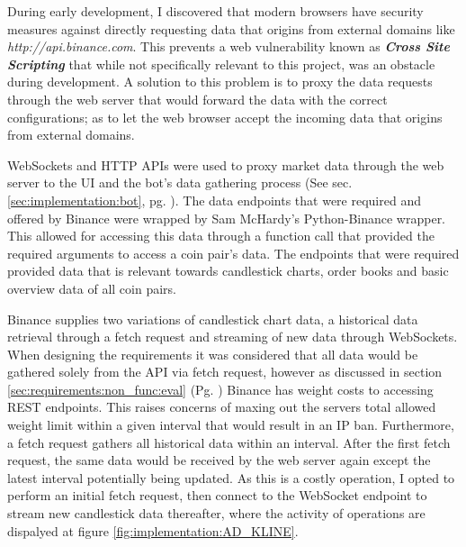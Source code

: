 \noindent During early development, I discovered that modern browsers have security measures against directly requesting data that origins from external domains like \textit{http://api.binance.com}. This prevents a web vulnerability known as \textit{\textbf{Cross Site Scripting}} that while not specifically relevant to this project, was an obstacle during development. A solution to this problem is to proxy the data requests through the web server that would forward the data with the correct configurations; as to let the web browser accept the incoming data that origins from external domains.

WebSockets and HTTP APIs were used to proxy market data through the web server to the UI and the bot's data gathering process (See sec. \ref{sec:implementation:bot}, pg. \pageref{sec:implementation:bot}). The data endpoints that were required and offered by Binance were wrapped by Sam McHardy's \cite{MISC:Python-Binance} Python-Binance wrapper. This allowed for accessing this data through a function call that provided the required arguments to access a coin pair's data. The endpoints that were required provided data that is relevant towards candlestick charts, order books and basic overview data of all coin pairs.

Binance supplies two variations of candlestick chart data, a historical data retrieval through a fetch request and streaming of new data through WebSockets. When designing the requirements it was considered that all data would be gathered solely from the API via fetch request, however as discussed in section \ref{sec:requirements:non_func:eval} (Pg. \pageref{sec:requirements:non_func:eval}) Binance has weight costs to accessing REST endpoints. This raises concerns of maxing out the servers total allowed weight limit within a given interval that would result in an IP ban. Furthermore, a fetch request gathers all historical data within an interval. After the first fetch request, the same data would be received by the web server again except the latest interval potentially being updated. As this is a costly operation, I opted to perform an initial fetch request, then connect to the WebSocket endpoint to stream new candlestick data thereafter, where the activity of operations are dispalyed at figure \ref{fig:implementation:AD_KLINE}. 

